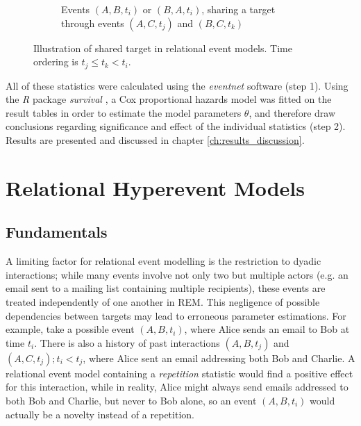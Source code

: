 \begin{figure}
\begin{mdframed}
\begin{subfigure}[t]{0.3\linewidth}
		\caption{Events $(A,B,t_i)$ or $(B,A,t_i)$, sharing a target through events $(A,C,t_j)$ and $(B,C,t_k)$}
	\end{subfigure}
	\hfill
	\caption{Illustration of shared target in relational event models. Time ordering is $t_j \leq t_k < t_i$.}
	\label{fig:rem_triangle_parents}
	\end{mdframed}
\end{figure}

All of these statistics were calculated using the \emph{eventnet} software \cite{eventnet_rem,eventnet_rhem} (step 1). Using the \emph{R} package \emph{survival} \cite{survival-package}, a Cox proportional hazards model was fitted on the result tables in order to estimate the model parameters $\theta$, and therefore draw conclusions regarding significance and effect of the individual statistics (step 2). Results are presented and discussed in chapter \ref{ch:results_discussion}.

\section{Relational Hyperevent Models}
\label{sec:rhem}

\subsection{Fundamentals}
\label{sec:rhem_fundamentals}

A limiting factor for relational event modelling is the restriction to dyadic interactions; while many events involve not only two but multiple actors (e.g. an email sent to a mailing list containing multiple recipients), these events are treated independently of one another in REM. This negligence of possible dependencies between targets may lead to erroneous parameter estimations. For example, take a possible event $(A,B,t_i)$, where Alice sends an email to Bob at time $t_i$. There is also a history of past interactions $(A,B,t_j)$ and $(A,C,t_j); t_i < t_j$, where Alice sent an email addressing both Bob and Charlie. A relational event model containing a \emph{repetition} statistic would find a positive effect for this interaction, while in reality, Alice might always send emails addressed to both Bob and Charlie, but never to Bob alone, so an event $(A,B,t_i)$ would actually be a novelty instead of a repetition. 

